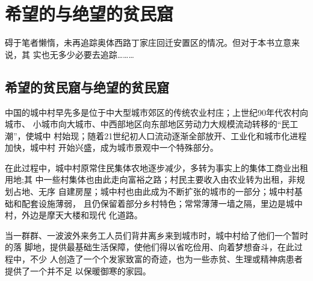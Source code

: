 




\chapter{希望的与绝望的贫民窟}

碍于笔者懒惰，未再追踪奥体西路丁家庄回迁安置区的情况。但对于本书立意来说，其
实也无多少必要去追踪………



\section{希望的贫民窟与绝望的贫民窟}
\label{sec:hopedespair}

中国的城中村早先多是位于中大型城市郊区的传统农业村庄；上世纪90年代农村向城市、
小城市向大城市、中西部地区向东部地区劳动力大规模流动转移的“民工潮”，使城中
村始现；随着21世纪初人口流动逐渐全部放开、工业化和城市化进程加快，城中村
开始兴盛，成为城市景观中一个特殊部分。

在此过程中，城中村原常住民集体农地逐步减少，多转为事实上的集体工商业出租用地;其
中一些村集体也由此走向富裕之路；村民主要收入由农业转为出租，非规划占地、无序
自建房屋；城中村也由此成为不断扩张的城市的一部分；城中村基础和配套设施薄弱，
且仍保留着部分乡村特色；常常薄薄一墙之隔，里边是城中村，外边是摩天大楼和现代
化道路。

当一群群、一波波外来务工人员们背井离乡来到城市时，城中村给了他们一个暂时的落
脚地，提供最基础生活保障，使他们得以省吃俭用、向着梦想奋斗，在此过程中，不少
人创造了一个个发家致富的奇迹，也为一些赤贫、生理或精神病患者提供了一个并不足
以保暖御寒的家园。


